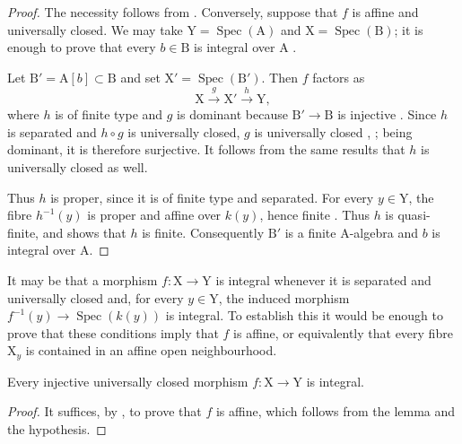 \begin{proof}
The necessity follows from . Conversely, suppose that $f$ is affine and universally closed. We may take $\mathrm{Y}=\operatorname{Spec}(\mathrm{A})$ and $\mathrm{X}=\operatorname{Spec}(\mathrm{B})$; it is enough to prove that every $b\in\mathrm{B}$ is integral over $\mathrm{A}$ .

Let $\mathrm{B}'=\mathrm{A}[b]\subset\mathrm{B}$ and set $\mathrm{X}'=\operatorname{Spec}(\mathrm{B}')$. Then $f$ factors as
\[
  \mathrm{X}\xrightarrow{g}\mathrm{X}'\xrightarrow{h}\mathrm{Y},
\]
where $h$ is of finite type and $g$ is dominant because $\mathrm{B}'\to\mathrm{B}$ is injective . Since $h$ is separated and $h\circ g$ is universally closed, $g$ is universally closed , ; being dominant, it is therefore surjective. It follows from the same results that $h$ is universally closed as well.

Thus $h$ is proper, since it is of finite type and separated. For every $y\in\mathrm{Y}$, the fibre $h^{-1}(y)$ is proper and affine over $k(y)$, hence finite . Thus $h$ is quasi-finite, and  shows that $h$ is finite. Consequently $\mathrm{B}'$ is a finite $\mathrm{A}$-algebra and $b$ is integral over $\mathrm{A}$.
\end{proof}

\begin{remark}[18.12.9]
\label{IV.18.12.9}
It may be that a morphism $f:\mathrm{X}\to\mathrm{Y}$ is integral whenever it is separated and universally closed and, for every $y\in\mathrm{Y}$, the induced morphism $f^{-1}(y)\to\operatorname{Spec}(k(y))$ is integral.
To establish this it would be enough to prove that these conditions imply that $f$ is affine, or equivalently that every fibre $\mathrm{X}_y$ is contained in an affine open neighbourhood.
\end{remark}

\begin{corollary}[18.12.10]
\label{IV.18.12.10}
Every injective universally closed morphism $f:\mathrm{X}\to\mathrm{Y}$ is integral.
\end{corollary}

\begin{proof}
It suffices, by , to prove that $f$ is affine, which follows from the lemma  and the hypothesis.
\end{proof}


